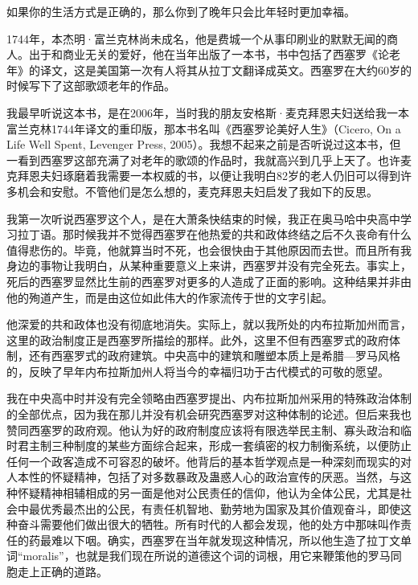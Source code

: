 \renewcommand{\bookchapter}{2}
\cleardoublepage
{}

\begin{WisdomBox}
\par

如果你的生活方式是正确的，那么你到了晚年只会比年轻时更加幸福。
\par
\end{WisdomBox}

1744年，本杰明·富兰克林尚未成名，他是费城一个从事印刷业的默默无闻的商人。出于和商业无关的爱好，他在当年出版了一本书，书中包括了西塞罗《论老年》的译文，这是美国第一次有人将其从拉丁文翻译成英文。西塞罗在大约60岁的时候写下了这部歌颂老年的作品。
\par

我最早听说这本书，是在2006年，当时我的朋友安格斯·麦克拜恩夫妇送给我一本富兰克林1744年译文的重印版，那本书名叫《西塞罗论美好人生》（Cicero, On a Life Well Spent, Levenger Press, 2005）。我想不起来之前是否听说过这本书，但一看到西塞罗这部充满了对老年的歌颂的作品时，我就高兴到几乎上天了。也许麦克拜恩夫妇琢磨着我需要一本权威的书，以便让我明白82岁的老人仍旧可以得到许多机会和安慰。不管他们是怎么想的，麦克拜恩夫妇启发了我如下的反思。
\par

我第一次听说西塞罗这个人，是在大萧条快结束的时候，我正在奥马哈中央高中学习拉丁语。那时候我并不觉得西塞罗在他热爱的共和政体终结之后不久丧命有什么值得悲伤的。毕竟，他就算当时不死，也会很快由于其他原因而去世。而且所有我身边的事物让我明白，从某种重要意义上来讲，西塞罗并没有完全死去。事实上，死后的西塞罗显然比生前的西塞罗对更多的人造成了正面的影响。这种结果并非由他的殉道产生，而是由这位如此伟大的作家流传于世的文字引起。
\par

他深爱的共和政体也没有彻底地消失。实际上，就以我所处的内布拉斯加州而言，这里的政治制度正是西塞罗所描绘的那样。此外，这里不但有西塞罗式的政府体制，还有西塞罗式的政府建筑。中央高中的建筑和雕塑本质上是希腊—罗马风格的，反映了早年内布拉斯加州人将当今的幸福归功于古代模式的可敬的愿望。
\par

我在中央高中时并没有完全领略由西塞罗提出、内布拉斯加州采用的特殊政治体制的全部优点，因为我在那儿并没有机会研究西塞罗对这种体制的论述。但后来我也赞同西塞罗的政府观。他认为好的政府制度应该将有限选举民主制、寡头政治和临时君主制三种制度的某些方面综合起来，形成一套缜密的权力制衡系统，以便防止任何一个政客造成不可容忍的破坏。他背后的基本哲学观点是一种深刻而现实的对人本性的怀疑精神，包括了对多数暴政及蛊惑人心的政治宣传的厌恶。当然，与这种怀疑精神相辅相成的另一面是他对公民责任的信仰，他认为全体公民，尤其是社会中最优秀最杰出的公民，有责任机智地、勤劳地为国家及其价值观奋斗，即使这种奋斗需要他们做出很大的牺牲。所有时代的人都会发现，他的处方中那味叫作责任的药最难以下咽。确实，西塞罗在当年就发现这种情况，所以他生造了拉丁文单词“moralis”，也就是我们现在所说的道德这个词的词根，用它来鞭策他的罗马同胞走上正确的道路。
\par


